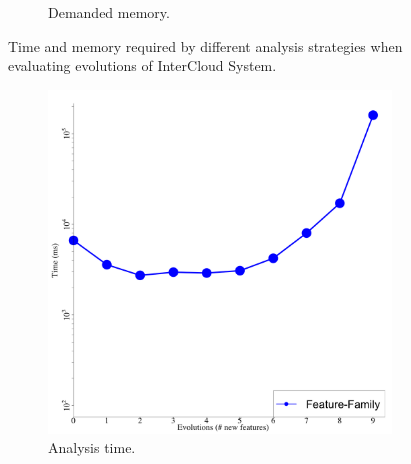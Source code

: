 \begin{figure}[p]
\begin{subfigure}[t]{0.5\columnwidth}
    \caption{Demanded memory.}
    \label{fig:intercloud-footprint}
  \end{subfigure}
  \caption{Time and memory required by different analysis strategies when
  evaluating evolutions of InterCloud System.}
  \label{fig:intercloud-scalability}
\end{figure}


\begin{figure}[p]
  \begin{subfigure}[t]{0.5\columnwidth}
    \centering
    \includegraphics[width=1.0\columnwidth]{img/logtankwarTime}
    \caption{Analysis time.}
    \label{fig:tankwar-analysisTime}
  \end{subfigure}
  \begin{subfigure}[t]{0.5\columnwidth}
    \centering

\end{subfigure}
\end{figure}
